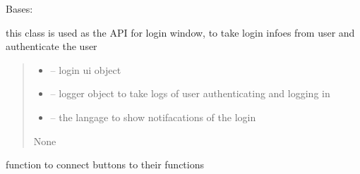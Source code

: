 \documentclass[letterpaper,10pt,english]{sphinxmanual}
\begin{document}
\begin{savenotes}\begin{fulllineitems}
\label{\detokenize{setting/login_api:oxin.login_api.API}}
\pysigstartsignatures
{}
\pysigstopsignatures
\sphinxAtStartPar
Bases: 

\sphinxAtStartPar
this class is used as the API for login window, to take login infoes from user and authenticate the user
\begin{quote}\begin{description}
\begin{itemize}
\item {} 
\sphinxAtStartPar
{} – login ui object

\item {} 
\sphinxAtStartPar
{} – logger object to take logs of user authenticating and logging in

\item {} 
\sphinxAtStartPar
{} – the langage to show notifacations of the login

\end{itemize}

\sphinxAtStartPar
None

\end{description}\end{quote}

\begin{savenotes}\begin{fulllineitems}
\label{\detokenize{setting/login_api:oxin.login_api.API.button_connector}}
\pysigstartsignatures
{}
\pysigstopsignatures
\sphinxAtStartPar
function to connect buttons to their functions

\end{fulllineitems}\end{savenotes}


\end{fulllineitems}
\end{savenotes}
\end{document}
